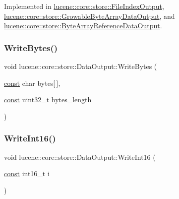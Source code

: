 Implemented in \mbox{\hyperlink{classlucene_1_1core_1_1store_1_1FileIndexOutput_a7f627b777857d45398afc0b740f036ff}{lucene\+::core\+::store\+::\+File\+Index\+Output}}, \mbox{\hyperlink{classlucene_1_1core_1_1store_1_1GrowableByteArrayDataOutput_ade5509d15287b0b7a70a50b8ebad79d1}{lucene\+::core\+::store\+::\+Growable\+Byte\+Array\+Data\+Output}}, and \mbox{\hyperlink{classlucene_1_1core_1_1store_1_1ByteArrayReferenceDataOutput_a56eb71d664e7f32fd874acdf0c899e0c}{lucene\+::core\+::store\+::\+Byte\+Array\+Reference\+Data\+Output}}.

\mbox{\label{classlucene_1_1core_1_1store_1_1DataOutput_aee542a6d69d756f6ddaa4f1ea1db7fa4}} 
\subsubsection{\texorpdfstring{Write\+Bytes()}{WriteBytes()}\hspace{0.1cm}{\footnotesize\ttfamily [2/2]}}
{\footnotesize\ttfamily void lucene\+::core\+::store\+::\+Data\+Output\+::\+Write\+Bytes (\begin{DoxyParamCaption}\item[{\mbox{\hyperlink{ZlibCrc32_8h_a2c212835823e3c54a8ab6d95c652660e}{const}} char}]{bytes\mbox{[}$\,$\mbox{]},  }\item[{\mbox{\hyperlink{ZlibCrc32_8h_a2c212835823e3c54a8ab6d95c652660e}{const}} uint32\+\_\+t}]{bytes\+\_\+length }\end{DoxyParamCaption})\hspace{0.3cm}{\ttfamily [inline]}}

\mbox{\label{classlucene_1_1core_1_1store_1_1DataOutput_ae1d2397af457949107f4f14a4cad969c}} 
\subsubsection{\texorpdfstring{Write\+Int16()}{WriteInt16()}}
{\footnotesize\ttfamily void lucene\+::core\+::store\+::\+Data\+Output\+::\+Write\+Int16 (\begin{DoxyParamCaption}\item[{\mbox{\hyperlink{ZlibCrc32_8h_a2c212835823e3c54a8ab6d95c652660e}{const}} int16\+\_\+t}]{i }\end{DoxyParamCaption})\hspace{0.3cm}{\ttfamily [inline]}}

